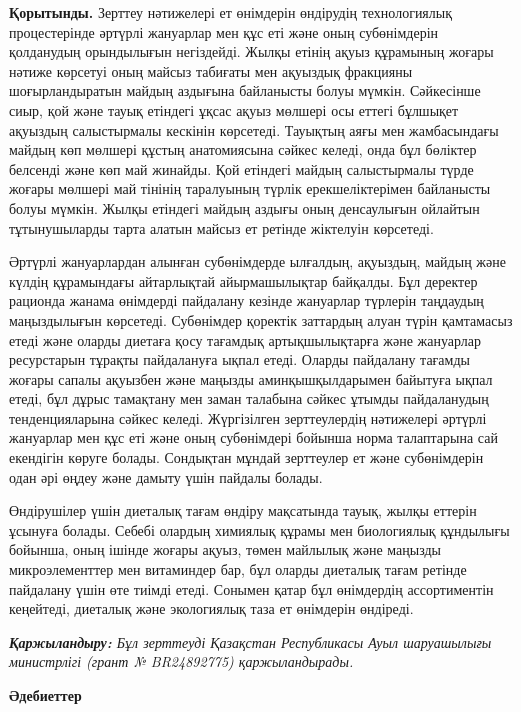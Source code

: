 \begin{multicols}{2}
{\bfseries Қорытынды.} Зерттеу нәтижелері ет өнімдерін өндірудің
технологиялық процестерінде әртүрлі жануарлар мен құс еті және оның
субөнімдерін қолданудың орындылығын негіздейді. Жылқы етінің ақуыз
құрамының жоғары нәтиже көрсетуі оның майсыз табиғаты мен ақуыздық
фракцияны шоғырландыратын майдың аздығына байланысты болуы мүмкін.
Сәйкесінше сиыр, қой және тауық етіндегі ұқсас ақуыз мөлшері осы еттегі
бұлшықет ақуыздың салыстырмалы кескінін көрсетеді. Тауықтың аяғы мен
жамбасындағы майдың көп мөлшері құстың анатомиясына сәйкес келеді, онда
бұл бөліктер белсенді және көп май жинайды. Қой етіндегі майдың
салыстырмалы түрде жоғары мөлшері май тінінің таралуының түрлік
ерекшеліктерімен байланысты болуы мүмкін. Жылқы етіндегі майдың аздығы
оның денсаулығын ойлайтын тұтынушыларды тарта алатын майсыз ет ретінде
жіктелуін көрсетеді.

Әртүрлі жануарлардан алынған субөнімдерде ылғалдың, ақуыздың, майдың
және күлдің құрамындағы айтарлықтай айырмашылықтар байқалды. Бұл
деректер рационда жанама өнімдерді пайдалану кезінде жануарлар түрлерін
таңдаудың маңыздылығын көрсетеді. Субөнімдер қоректік заттардың алуан
түрін қамтамасыз етеді және оларды диетаға қосу тағамдық артықшылықтарға
және жануарлар ресурстарын тұрақты пайдалануға ықпал етеді. Оларды
пайдалану тағамды жоғары сапалы ақуызбен және маңызды аминқышқылдарымен
байытуға ықпал етеді, бұл дұрыс тамақтану мен заман талабына сәйкес
ұтымды пайдаланудың тенденцияларына сәйкес келеді. Жүргізілген
зерттеулердің нәтижелері әртүрлі жануарлар мен құс еті және оның
субөнімдері бойынша норма талаптарына сай екендігін көруге болады.
Сондықтан мұндай зерттеулер ет және субөнімдерін одан әрі өңдеу және
дамыту үшін пайдалы болады.

Өндірушілер үшін диеталық тағам өндіру мақсатында тауық, жылқы еттерін
ұсынуға болады. Себебі олардың химиялық құрамы мен биологиялық құндылығы
бойынша, оның ішінде жоғары ақуыз, төмен майлылық және маңызды
микроэлементтер мен витаминдер бар, бұл оларды диеталық тағам ретінде
пайдалану үшін өте тиімді етеді. Сонымен қатар бұл өнімдердің
ассортиментін кеңейтеді, диеталық және экологиялық таза ет өнімдерін
өндіреді.

\emph{{\bfseries Қаржыландыру:} Бұл зерттеуді Қазақстан Республикасы Ауыл
шаруашылығы министрлігі (грант № BR24892775) қаржыландырады.}
\end{multicols}

\begin{center}
{\bfseries Әдебиеттер}
\end{center}

